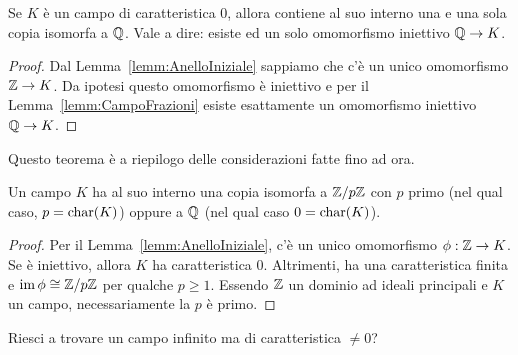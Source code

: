 \begin{coro}
Se \(K\) è un campo di caratteristica \(0\), allora contiene al suo interno una e una sola copia isomorfa a \(\mathbb{Q}\). Vale a dire: esiste ed un solo omomorfismo iniettivo \(\mathbb{Q} \to K\).
\end{coro}

\begin{proof}
Dal Lemma~\ref{lemm:AnelloIniziale} sappiamo che c'è un unico omomorfismo \(\mathbb{Z} \to K\). Da ipotesi questo omomorfismo è iniettivo e per il Lemma~\ref{lemm:CampoFrazioni} esiste esattamente un omomorfismo iniettivo \(\mathbb{Q} \to K\). 
\end{proof}

Questo teorema è a riepilogo delle considerazioni fatte fino ad ora.

\begin{teor}
Un campo \(K\) ha al suo interno una copia isomorfa a \(\mathbb{Z}/p\mathbb{Z}\) con \(p\) primo (nel qual caso, \(p = \operatorname{char}(K)\)) oppure a \(\mathbb{Q}\) (nel qual caso \(0 = \operatorname{char}(K)\)).
\end{teor}

\begin{proof}
Per il Lemma~\ref{lemm:AnelloIniziale}, c'è un unico omomorfismo \(\phi : \mathbb{Z} \to K\). Se è iniettivo, allora \(K\) ha caratteristica \(0\). Altrimenti, ha una caratteristica finita e \(\operatorname{im} \phi \cong \mathbb{Z}/p\mathbb{Z}\) per qualche \(p \ge 1\). Essendo \(\mathbb{Z}\) un dominio ad ideali principali e \(K\) un campo, necessariamente la \(p\) è primo.
\end{proof}

\begin{eser}
Riesci a trovare un campo infinito ma di caratteristica \(\ne 0\)?
\end{eser}

%
%



